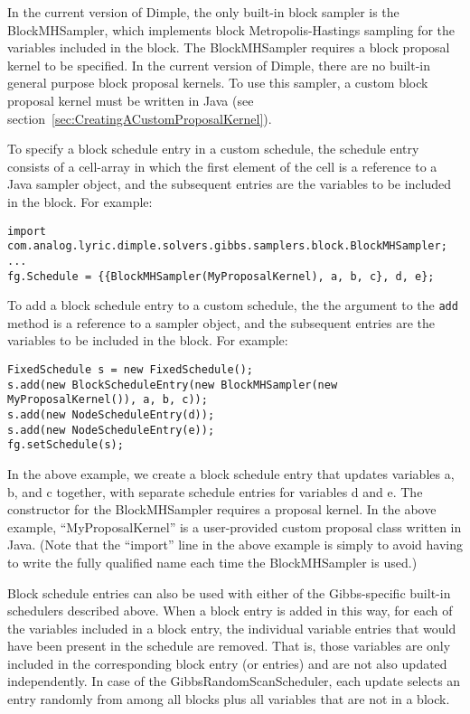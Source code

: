 In the current version of Dimple, the only built-in block sampler is the BlockMHSampler, which implements block Metropolis-Hastings sampling for the variables included in the block.  The BlockMHSampler requires a block proposal kernel to be specified.  In the current version of Dimple, there are no built-in general purpose block proposal kernels.  To use this sampler, a custom block proposal kernel must be written \ifmatlab in Java \fi (see section~\ref{sec:CreatingACustomProposalKernel}).

\ifmatlab
To specify a block schedule entry in a custom schedule, the schedule entry consists of a cell-array in which the first element of the cell is a reference to a Java sampler object, and the subsequent entries are the variables to be included in the block.  For example:

\begin{lstlisting}
import com.analog.lyric.dimple.solvers.gibbs.samplers.block.BlockMHSampler;
...
fg.Schedule = {{BlockMHSampler(MyProposalKernel), a, b, c}, d, e};
\end{lstlisting}
\fi

\ifjava
To add a block schedule entry to a custom schedule, the the argument to the \texttt{add} method is a reference to a sampler object, and the subsequent entries are the variables to be included in the block.  For example:

\begin{lstlisting}
FixedSchedule s = new FixedSchedule();
s.add(new BlockScheduleEntry(new BlockMHSampler(new MyProposalKernel()), a, b, c));
s.add(new NodeScheduleEntry(d));
s.add(new NodeScheduleEntry(e));
fg.setSchedule(s);
\end{lstlisting}
\fi

In the above example, we create a block schedule entry that updates variables a, b, and c together, with separate schedule entries for variables d and e.  The constructor for the BlockMHSampler requires a proposal kernel.  In the above example, ``MyProposalKernel'' is a user-provided custom proposal class \ifmatlab written in Java\fi.  \ifmatlab (Note that the ``import'' line in the above example is simply to avoid having to write the fully qualified name each time the BlockMHSampler is used.) \fi

Block schedule entries can also be used with either of the Gibbs-specific built-in schedulers described above.  When a block entry is added in this way, for each of the variables included in a block entry, the individual variable entries that would have been present in the schedule are removed.  That is, those variables are only included in the corresponding block entry (or entries) and are not also updated independently.  In case of the GibbsRandomScanScheduler, each update selects an entry randomly from among all blocks plus all variables that are not in a block.

